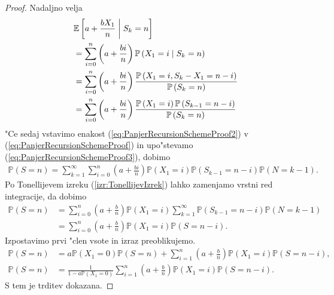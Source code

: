 \documentclass[12pt, a4paper, reqno]{amsart}
\theoremstyle{definition}
\theoremstyle{plain}
\newcommand{\E}{\mathbb{E}}
\newcommand{\Prob}{\mathbb{P}}
\newcommand{\1}{\mathds{1}}
\begin{document}
\begin{proof}
        Nadaljno velja  
        \begin{align}   
            & \E\left[a + \frac{bX_1}{n} \biggm|   S_k = n\right] \nonumber \\
            &= \sum_{i = 0}^n\left(a + \frac{bi}{n}\right)\Prob\left(X_1 = i\mid S_k = n\right) \nonumber \\
            &= \sum_{i = 0}^n\left(a + \frac{bi}{n}\right)\frac{\Prob\left(X_1 = i, S_k - X_1 = n - i\right)}{\Prob\left(S_k = n\right)} \nonumber \\
            &= \sum_{i = 0}^n\left(a + \frac{bi}{n}\right)\frac{\Prob\left(X_1 = i\right)\Prob\left(S_{k- 1} = n - i\right)}{\Prob\left(S_k = n\right)} \label{eq:PanjerRecursionSchemeProof3} 
        \end{align}
        "Ce sedaj vstavimo enakost (\ref{eq:PanjerRecursionSchemeProof2}) v (\ref{eq:PanjerRecursionSchemeProof}) 
        in upo"stevamo (\ref{eq:PanjerRecursionSchemeProof3}), dobimo
        \begin{align*}
            \Prob\left(S = n\right) 
                = \sum_{k = 1}^\infty\sum_{i = 0}^n \left(a + \frac{bi}{n}\right)\Prob\left(X_1 = i\right)\Prob\left(S_{k - 1} = n - i\right)\Prob\left(N = k - 1\right).
        \end{align*}
        Po Tonellijevem izreku (\ref{izr:TonellijevIzrek}) lahko zamenjamo vrstni red integracije, da dobimo
        \begin{align*}
            \Prob\left(S = n\right) 
                &= \sum_{i = 0}^n\left(a + \frac{b}{n}\right)\Prob\left(X_1 = i\right)\sum_{k = 1}^\infty\Prob\left(S_{k - 1} = n - i\right)\Prob\left(N = k - 1\right)\\
                &= \sum_{i = 0}^n\left(a + \frac{b}{n}\right)\Prob\left(X_1 = i\right)\Prob\left(S = n - i\right).
        \end{align*}
        Izpostavimo prvi "clen vsote in izraz preoblikujemo.
        \begin{align*}
            \Prob\left(S = n\right) 
                &= a\Prob\left(X_1 = 0\right)\Prob\left(S = n\right) + \sum_{i = 1}^n\left(a + \frac{b}{n}\right)\Prob\left(X_1 = i\right)\Prob\left(S = n - i\right), \\
            \Prob\left(S = n\right)
                &= \frac{1}{1 - a\Prob\left(X_1 = 0\right)}\sum_{i = 1}^n\left(a + \frac{b}{n}\right)\Prob\left(X_1 = i\right)\Prob\left(S = n - i\right).
        \end{align*}
        S tem je trditev dokazana.
    \end{proof}
\end{document}
